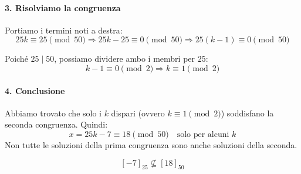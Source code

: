 \documentclass[a4paper,12pt]{article}
\begin{document}
\paragraph{3. Risolviamo la congruenza}
Portiamo i termini noti a destra:
\[
25k \equiv 25 \pmod{50}
\Rightarrow 25k - 25 \equiv 0 \pmod{50}
\Rightarrow 25(k - 1) \equiv 0 \pmod{50}
\]

Poiché \(25 \mid 50\), possiamo dividere ambo i membri per \(25\):
\[
k - 1 \equiv 0 \pmod{2} \Rightarrow k \equiv 1 \pmod{2}
\]

\paragraph{4. Conclusione}
Abbiamo trovato che solo i \(k\) dispari (ovvero \(k \equiv 1 \pmod{2}\)) soddisfano la seconda congruenza. Quindi:
\[
x = 25k - 7 \equiv 18 \pmod{50} \quad \text{solo per alcuni } k
\]
Non tutte le soluzioni della prima congruenza sono anche soluzioni della seconda.

\[
\boxed{[-7]_{25} \not\subseteq [18]_{50}}
\]
\end{document}
